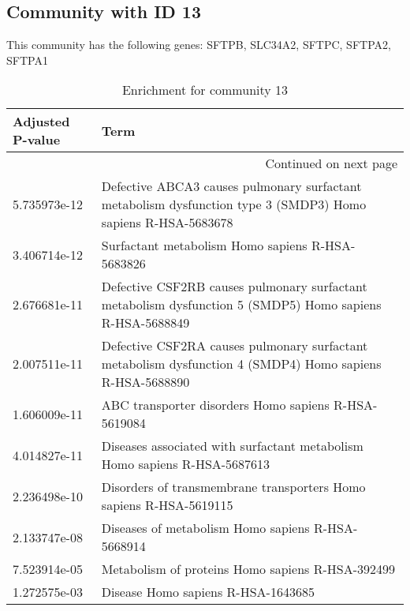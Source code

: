 \subsection*{Community with ID 13}
This community has the following genes: SFTPB, SLC34A2, SFTPC, SFTPA2, SFTPA1
\\
\begin{longtable}{p{2.4cm}p{14.5cm}}
\caption{Enrichment for community 13}\\
\toprule
Adjusted \newline P-value &                                                                                                          Term \\
\midrule
\endhead
\midrule
\multicolumn{2}{r}{{Continued on next page}} \\
\midrule
\endfoot

\bottomrule
\endlastfoot
             5.735973e-12 &  Defective ABCA3 causes pulmonary surfactant metabolism dysfunction type 3 (SMDP3) Homo sapiens R-HSA-5683678 \\
             3.406714e-12 &                                                              Surfactant metabolism Homo sapiens R-HSA-5683826 \\
             2.676681e-11 &      Defective CSF2RB causes pulmonary surfactant metabolism dysfunction 5 (SMDP5) Homo sapiens R-HSA-5688849 \\
             2.007511e-11 &      Defective CSF2RA causes pulmonary surfactant metabolism dysfunction 4 (SMDP4) Homo sapiens R-HSA-5688890 \\
             1.606009e-11 &                                                          ABC transporter disorders Homo sapiens R-HSA-5619084 \\
             4.014827e-11 &                                     Diseases associated with surfactant metabolism Homo sapiens R-HSA-5687613 \\
             2.236498e-10 &                                            Disorders of transmembrane transporters Homo sapiens R-HSA-5619115 \\
             2.133747e-08 &                                                             Diseases of metabolism Homo sapiens R-HSA-5668914 \\
             7.523914e-05 &                                                              Metabolism of proteins Homo sapiens R-HSA-392499 \\
             1.272575e-03 &                                                                            Disease Homo sapiens R-HSA-1643685 \\
\end{longtable}


